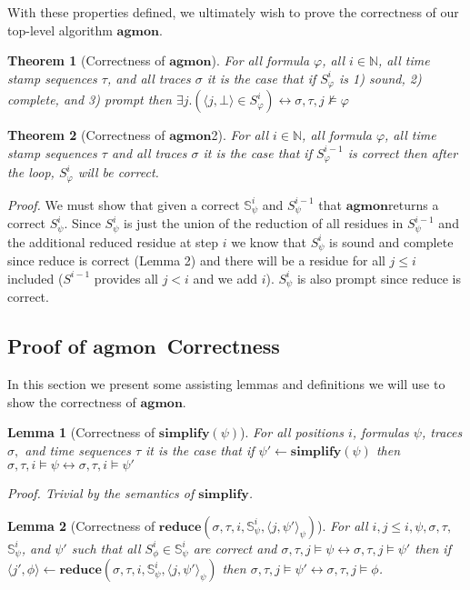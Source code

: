 \documentclass[10pt,a4paper]{article}
\newcommand{\rp}[2]{\ensuremath{\langle #1, #2 \rangle}}
\newcommand{\agmon}{\ensuremath{\mathbf{agmon}}}
\newcommand{\rpt}[3]{\ensuremath{\langle #1, #2 \rangle}_{#3}}
\newtheorem{thm}{Theorem}
\newtheorem{lemma}{Lemma}
\begin{document}
With these properties defined, we ultimately wish to prove the correctness of our top-level algorithm \agmon.

\begin{thm}[Correctness of \agmon]
For all formula $\varphi$, all $i \in \mathbb{N}$, all time stamp sequences $\tau$, and all traces $\sigma$ it is the case that if $S^i_{\varphi}$ is 1) sound, 2) complete, and 3) prompt then $\exists j.(\rp{j}{\bot} \in S^i_{\varphi}) \leftrightarrow \sigma, \tau, j \nvDash \varphi$
\end{thm}

\begin{thm}[Correctness of \agmon 2]
For all $i \in \mathbb{N}$, all formula $\varphi$, all time stamp sequences $\tau$ and all traces $\sigma$ it is the case that if $S^{i-1}_{\varphi}$ is correct then after the loop, $S^{i}_{\varphi}$ will be correct.
\end{thm}
\textit{Proof.} We must show that given a correct $\mathbb{S}^i_{\psi}$ and $S^{i-1}_{\psi}$ that \agmon returns a correct $S^i_{\psi}$. Since $S^i_{\psi}$ is just the union of the reduction of all residues in $S^{i-1}_{\psi}$ and the additional reduced residue at step $i$ we know that $S^i_{\psi}$ is sound and complete since reduce is correct (Lemma 2) and there will be a residue for all $j \leq i$ included ($S^{i-1}$ provides all $j < i$ and we add $i$). $S^i_{\psi}$ is also prompt since reduce is correct.

\subsection{Proof of \agmon\ Correctness}
In this section we present some assisting lemmas and definitions we will use to show the correctness of \agmon.

\begin{lemma}[Correctness of $\mathbf{simplify}(\psi)$] For all positions $i$, formulas $\psi$, traces $\sigma,$ and time sequences $\tau$ 
it is the case that if $\psi' \leftarrow \mathbf{simplify}(\psi)$ then $\sigma, \tau, i \vDash \psi \leftrightarrow \sigma, \tau, i \vDash \psi'$

Proof. Trivial by the semantics of $\mathbf{simplify}$.
\end{lemma}


\begin{lemma}[Correctness of $\mathbf{reduce}(\sigma, \tau, i, \mathbb{S}^i_{\psi}, \rpt{j}{\psi'}{\psi})$]
For all $i, j \leq i, \psi, \sigma, \tau,$ $\mathbb{S}^i_{\psi}$, and $\psi'$ such that all $S^i_\phi \in \mathbb{S}^i_{\psi}$ are correct and $\sigma,\tau,j \vDash \psi \leftrightarrow \sigma,\tau,j\vDash \psi'$ then if $\rp{j'}{\phi} \leftarrow \mathbf{reduce}(\sigma,\tau,i,\mathbb{S}^i_{\psi}, \rpt{j}{\psi'}{\psi})$ then $\sigma, \tau, j \vDash \psi' \leftrightarrow \sigma, \tau, j \vDash \phi$.
\end{lemma}
\end{document}
